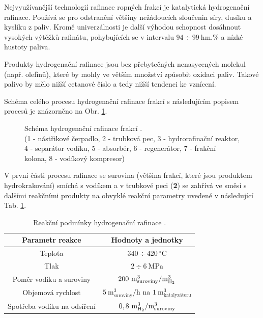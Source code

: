 Nejvyužívanější technologií rafinace ropných frakcí je katalytická hydrogenační rafinace. Používá se pro odstranění většiny nežádoucích sloučenin síry, dusíku a kyslíku z paliv. Kromě univerzálnosti je další výhodou schopnost dosáhnout vysokých výtěžků rafinátu, pohybujících se v intervalu $94\div99\ \mathrm{hm.}\%$ a nízké hustoty paliva. \cite{Blazek2006}

Produkty hydrogenační rafinace jsou bez přebytečných nenasycených molekul (např. olefínů), které by mohly ve větším množství způsobit oxidaci paliv. Takové palivo by mělo nižší cetanové číslo a tedy nižší tendenci ke vznícení. \cite{Seddon2022}

Schéma celého procesu hydrogenační rafinace frakcí s následujícím popisem procesů je znázorněno na Obr. \ref{fig:hydrogenr}.
\begin{figure}[h]
    \centering
    
    \caption[Schéma hydrogenační rafinace frakcí]{Schéma hydrogenační rafinace frakcí \cite{Blazek2006}.\\(1 - nástřikové čerpadlo, 2 - trubková pec, 3 - hydrorafinační reaktor, 4 - separátor vodíku, 5 - absorbér, 6 - regenerátor, 7 - frakční kolona, 8 - vodíkový kompresor)} \label{fig:hydrogenr}
\end{figure}

\noindent
V první části procesu rafinace se surovina (většina frakcí, které jsou produktem hydrokrakování) smíchá s vodíkem a v trubkové peci (\textbf{2}) se zahřívá ve směsi s dalšími reakčními produkty na obvyklé reakční parametry uvedené v následující Tab. \ref{tab:rp_hydrogenr}.
\begin{table}[h]
    \centering
    \begin{tabular}{|c|c|}
        \hline
        \textbf{Parametr reakce} & \textbf{Hodnoty a jednotky} \\ \hline\hline
        Teplota & $340\div420\ \mathrm{^{\circ}C}$ \\ \hline
        Tlak & $2 \div 6\ \mathrm{MPa}$ \\ \hline
        Poměr vodíku a suroviny & $200\ \mathrm{m^3_{suroviny}/m^3_{\ce{H2}}}$ \\ \hline
        Objemová rychlost & $5\ \mathrm{m^3_{suroviny}/h}$ na $1\ \mathrm{m^3_{\text{katalyzátoru}}}$ \\ \hline
        Spotřeba vodíku na odsíření & $0,8\ \mathrm{m^3_{\ce{H2}}/m^3_{suroviny}}$ \\ \hline
    \end{tabular}
    \caption[Reakční podmínky hydrogenační rafinace]{Reakční podmínky hydrogenační rafinace \cite{Seddon2022,Blazek2006}.}
    \label{tab:rp_hydrogenr}
\end{table}

